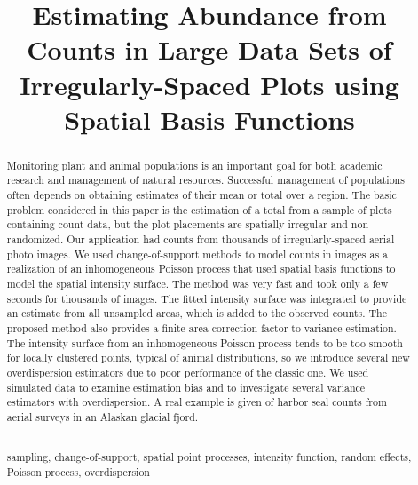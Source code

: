 \documentclass[12pt, titlepage]{article}\usepackage[]{graphicx}\usepackage[]{color}
\begin{document}

\titlepage
\title {Estimating Abundance from Counts in Large Data Sets of Irregularly-Spaced Plots using Spatial Basis Functions}


\maketitle


\begin{abstract}

Monitoring plant and animal populations is an important goal for both academic research and management of natural resources. Successful management of populations often depends on obtaining estimates of their mean or total over a region. The basic problem considered in this paper is the estimation of a total from a sample of plots containing count data, but the plot placements are spatially irregular and non randomized.  Our application had counts from thousands of irregularly-spaced aerial photo images.  We used change-of-support methods to model counts in images as a realization of an inhomogeneous Poisson process that used spatial basis functions to model the spatial intensity surface. The method was very fast and took only a few seconds for thousands of images.  The fitted intensity surface was integrated to provide an estimate from all unsampled areas, which is added to the observed counts. The proposed method also provides a finite area correction factor to variance estimation. The intensity surface from an inhomogeneous Poisson process tends to be too smooth for locally clustered points, typical of animal distributions, so we introduce several new overdispersion estimators due to poor performance of the classic one. We used simulated data to examine estimation bias and to investigate several variance estimators with overdispersion.  A real example is given of harbor seal counts from aerial surveys in an Alaskan glacial fjord. 

\noindent \hrulefill \\
 sampling, change-of-support, spatial point processes, intensity function, random effects, Poisson process, overdispersion

\end{abstract}
\end{document}
